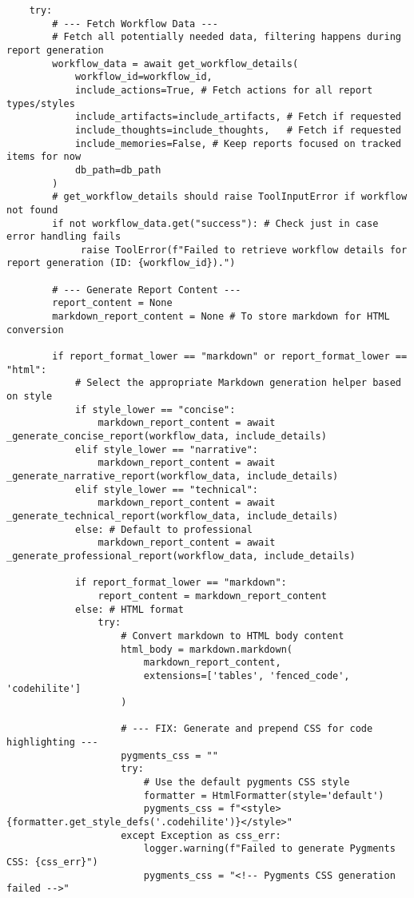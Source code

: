 \documentclass[12pt,a4paper]{article}
\begin{document}
\begin{pageablecode}
\begin{verbatim}
    try:
        # --- Fetch Workflow Data ---
        # Fetch all potentially needed data, filtering happens during report generation
        workflow_data = await get_workflow_details(
            workflow_id=workflow_id,
            include_actions=True, # Fetch actions for all report types/styles
            include_artifacts=include_artifacts, # Fetch if requested
            include_thoughts=include_thoughts,   # Fetch if requested
            include_memories=False, # Keep reports focused on tracked items for now
            db_path=db_path
        )
        # get_workflow_details should raise ToolInputError if workflow not found
        if not workflow_data.get("success"): # Check just in case error handling fails
             raise ToolError(f"Failed to retrieve workflow details for report generation (ID: {workflow_id}).")

        # --- Generate Report Content ---
        report_content = None
        markdown_report_content = None # To store markdown for HTML conversion

        if report_format_lower == "markdown" or report_format_lower == "html":
            # Select the appropriate Markdown generation helper based on style
            if style_lower == "concise":
                markdown_report_content = await _generate_concise_report(workflow_data, include_details)
            elif style_lower == "narrative":
                markdown_report_content = await _generate_narrative_report(workflow_data, include_details)
            elif style_lower == "technical":
                markdown_report_content = await _generate_technical_report(workflow_data, include_details)
            else: # Default to professional
                markdown_report_content = await _generate_professional_report(workflow_data, include_details)

            if report_format_lower == "markdown":
                report_content = markdown_report_content
            else: # HTML format
                try:
                    # Convert markdown to HTML body content
                    html_body = markdown.markdown(
                        markdown_report_content,
                        extensions=['tables', 'fenced_code', 'codehilite']
                    )

                    # --- FIX: Generate and prepend CSS for code highlighting ---
                    pygments_css = ""
                    try:
                        # Use the default pygments CSS style
                        formatter = HtmlFormatter(style='default')
                        pygments_css = f"<style>{formatter.get_style_defs('.codehilite')}</style>"
                    except Exception as css_err:
                        logger.warning(f"Failed to generate Pygments CSS: {css_err}")
                        pygments_css = "<!-- Pygments CSS generation failed -->"


\end{verbatim}
\end{pageablecode}
\end{document}
